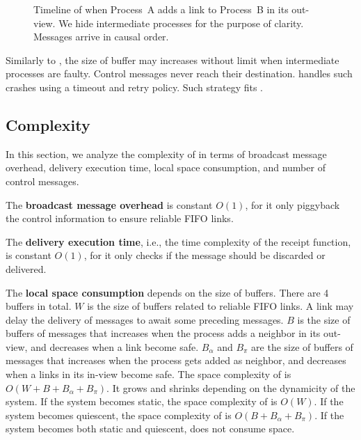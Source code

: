 \begin{figure*}
  \begin{center}
    
    \caption{\label{fig:timeline}Timeline of \RPCBROADCAST when Process~A adds a
      link to Process~B in its out-view. We hide intermediate processes for the
      purpose of clarity. Messages arrive in causal order.}
  \end{center}
\end{figure*}

Similarly to \PCBROADCAST, the size of buffer may increases without limit when
intermediate processes are faulty. Control messages never reach their
destination. \PCBROADCAST handles such crashes using a timeout and retry
policy. Such strategy fits \RPCBROADCAST.


\subsection{Complexity}
\label{subsec:complexity}

In this section, we analyze the complexity of \RPCBROADCAST in terms of
broadcast message overhead, delivery execution time, local space consumption,
and number of control messages. 

\noindent The \textbf{broadcast message overhead} is constant $O(1)$, for it
only piggyback the control information to ensure reliable FIFO links.

\noindent The \textbf{delivery execution time}, i.e., the time complexity of the
receipt function, is constant $O(1)$, for it only checks if the message should
be discarded or delivered.

\noindent The \textbf{local space consumption} depends on the size of
buffers. There are 4 buffers in total. $W$ is the size of buffers related to
reliable FIFO links. A link may delay the delivery of messages to await some
preceding messages. $B$ is the size of buffers of messages that increases when
the process adds a neighbor in its out-view, and decreases when a link become
safe. $B_\alpha$ and $B_\pi$ are the size of buffers of messages that increases
when the process gets added as neighbor, and decreases when a links in its
in-view become safe. The space complexity of \RPCBROADCAST is
$O(W + B + B_\alpha + B_\pi)$. It grows and shrinks depending on the dynamicity
of the system. If the system becomes static, the space complexity of
\RPCBROADCAST is $O(W)$. If the system becomes quiescent, the space complexity
of \RPCBROADCAST is $O(B + B_\alpha + B_\pi)$.  If the system becomes both
static and quiescent, \RPCBROADCAST does not consume
space. 

